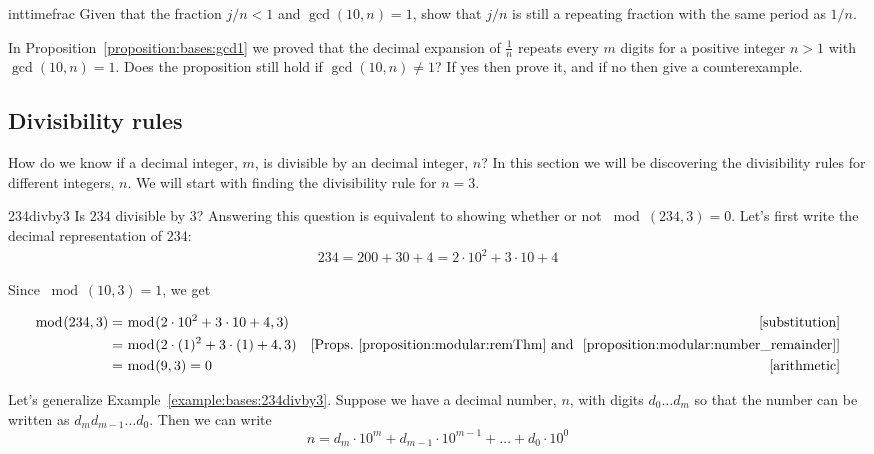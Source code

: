 \begin{exercise}{inttimefrac}
 Given that the fraction $j/n < 1$ and $\gcd(10,n)=1$, show that $j/n$  is still a repeating fraction with the same period as $1/n$.
\end{exercise}

\begin{exercise}{}
In Proposition~\ref{proposition:bases:gcd1} we proved that the decimal expansion of $\frac{1}{n}$ repeats every $m$ digits for a positive integer $n>1$ with 
$\gcd(10,n)=1$. Does the proposition still hold if $\gcd(10,n)\neq 1$? If yes then prove it, and  if no then give a counterexample.
\end{exercise}
\subsection{Divisibility rules}

How do we know if a decimal integer, $m$, is divisible by an decimal integer, $n$? In this section we will be discovering the divisibility rules for different integers, $n$. We will start with finding the divisibility rule for $n=3$.

\begin{example}{234divby3}
Is $234$ divisible by $3$?
Answering this question is equivalent to showing whether or not $\bmod(234,3)=0$. Let's first write the decimal representation of $234$: 
 \begin{align*}
234=200+30+4=2\cdot 10^{2}+3\cdot 10+4
\end{align*}

Since $\bmod(10,3)=1$, we get 

\begin{align*}
\bmod(234,3)&=\bmod(2 \cdot 10^{2}+3 \cdot 10+4,3) & [\textrm{substitution}]\\
&=\bmod(2\cdot(1)^2+3\cdot(1)+4,3) & [\textrm{Props.~\ref{proposition:modular:remThm} and ~\ref{proposition:modular:number_remainder}}]\\
&=\bmod(9,3)=0 & [\textrm{arithmetic}]
\end{align*}
\end{example}

Let's generalize Example~\ref{example:bases:234divby3}. Suppose we have a decimal number, $n$, with digits $d_{0}\dots d_{m}$  so that the number can be written as $d_{m}d_{m-1}\dots d_{0}$. Then we can write 
\begin{equation*}
n=d_{m}\cdot 10^{m}+d_{m-1}\cdot 10^{m-1}+\dots +d_{0}\cdot 10^{0}
\end{equation*}

